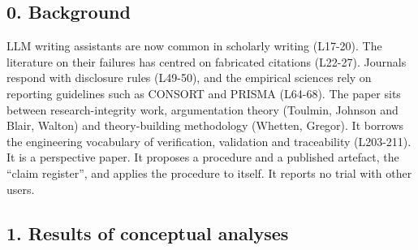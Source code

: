\medskip
{\small
\subsection{0. Background}\label{background}

LLM writing assistants are now common in scholarly writing (L17-20). The
literature on their failures has centred on fabricated citations
(L22-27). Journals respond with disclosure rules (L49-50), and the
empirical sciences rely on reporting guidelines such as CONSORT and
PRISMA (L64-68). The paper sits between research-integrity work,
argumentation theory (Toulmin, Johnson and Blair, Walton) and
theory-building methodology (Whetten, Gregor). It borrows the
engineering vocabulary of verification, validation and traceability
(L203-211). It is a perspective paper. It proposes a procedure and a
published artefact, the ``claim register'', and applies the procedure to
itself. It reports no trial with other users.

\subsection{1. Results of conceptual
analyses}\label{results-of-conceptual-analyses}

}
